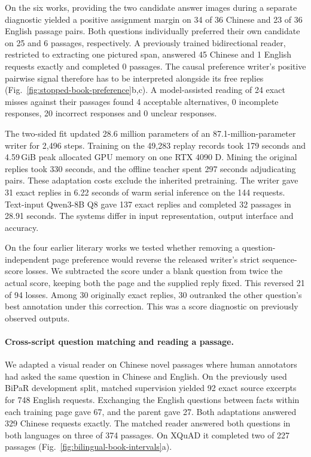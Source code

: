 \documentclass[12pt,a4paper]{article}
\providecommand{\DIFadd}[1]{{\protect\color{blue} \sf #1}} %
\begin{document}
\DIFadd{On the six works, providing the two candidate answer images during a separate diagnostic yielded a positive assignment margin on 34 of 36 Chinese and 23 of 36 English passage pairs. Both questions individually preferred their own candidate on 25 and 6 passages, respectively. A previously trained bidirectional reader, restricted to extracting one pictured span, answered 45 Chinese and 1 English requests exactly and completed 0 passages. The causal preference writer's positive pairwise signal therefore has to be interpreted alongside its free replies (Fig.~\ref{fig:stopped-book-preference}b,c). A model-assisted reading of 24 exact misses against their passages found 4 acceptable alternatives, 0 incomplete responses, 20 incorrect responses and 0 unclear responses.
}

\DIFadd{The two-sided fit updated 28.6 million parameters of an 87.1-million-parameter writer for 2,496 steps. Training on the 49,283 replay records took 179 seconds and 4.59\,GiB peak allocated GPU memory on one RTX 4090 D. Mining the original replies took 330 seconds, and the offline teacher spent 297 seconds adjudicating pairs. These adaptation costs exclude the inherited pretraining. The writer gave 31 exact replies in 6.22 seconds of warm serial inference on the 144 requests. Text-input Qwen3-8B Q8 gave 137 exact replies and completed 32 passages in 28.91 seconds. The systems differ in input representation, output interface and accuracy.
}

\DIFadd{On the four earlier literary works we tested whether removing a question-independent page preference would reverse the released writer's strict sequence-score losses. We subtracted the score under a blank question from twice the actual score, keeping both the page and the supplied reply fixed. This reversed 21 of 94 losses. Among 30 originally exact replies, 30 outranked the other question's best annotation under this correction. This was a score diagnostic on previously observed outputs.
}

\paragraph{\DIFadd{Cross-script question matching and reading a passage.}}
\DIFadd{We adapted a visual reader on Chinese novel passages where human annotators had asked the same question in Chinese and English. On the previously used BiPaR development split, matched supervision yielded 92 exact source excerpts for 748 English requests. Exchanging the English questions between facts within each training page gave 67, and the parent gave 27. Both adaptations answered 329 Chinese requests exactly. The matched reader answered both questions in both languages on three of 374 passages. On XQuAD it completed two of 227 passages (Fig.~\ref{fig:bilingual-book-intervals}a).
}
\end{document}
